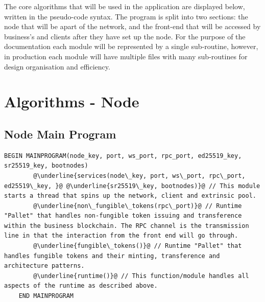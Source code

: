 The core algorithms that will be used in the application are displayed below, written in the pseudo-code syntax. The program is split into two sections: the node that will be apart of the network, and the front-end that will be accessed by business's and clients after they have set up the node. For the purpose of the documentation each module will be represented by a single sub-routine, however, in production each module will have multiple files with many sub-routines for design organisation and efficiency. \\

\section{Algorithms - Node}
\subsection{Node Main Program}

\begin{lstlisting}[caption=Main Program, escapechar=\@]
	BEGIN MAINPROGRAM(node_key, port, ws_port, rpc_port, ed25519_key, sr25519_key, bootnodes)
		@\underline{services(node\_key, port, ws\_port, rpc\_port, ed25519\_key, }@ @\underline{sr25519\_key, bootnodes)}@ // This module starts a thread that spins up the network, client and extrinsic pool.
		@\underline{non\_fungible\_tokens(rpc\_port)}@ // Runtime "Pallet" that handles non-fungible token issuing and transference within the business blockchain. The RPC channel is the transmission line in that the interaction from the front end will go through.
		@\underline{fungible\_tokens()}@ // Runtime "Pallet" that handles fungible tokens and their minting, transference and architecture patterns.
		@\underline{runtime()}@ // This function/module handles all aspects of the runtime as described above.
	END MAINPROGRAM

\end{lstlisting}
